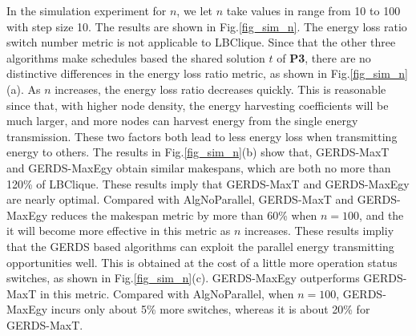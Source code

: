 \documentclass[journal,10pt]{IEEEtran}
\begin{document}
In the simulation experiment for $n$, we let $n$ take values in range from 10 to 100 with step size 10. The results are shown in Fig.\ref{fig_sim_n}. The energy loss ratio switch number metric is not applicable to LBClique. Since that the other three algorithms make schedules based the shared solution $t$ of \textbf{P3}, there are no distinctive differences in the energy loss ratio metric, as shown in Fig.\ref{fig_sim_n}(a). As $n$ increases, the energy loss ratio decreases quickly. This is reasonable since that, with higher node density, the energy harvesting coefficients will be much larger, and more nodes can harvest energy from the single energy transmission. These two factors both lead to less energy loss when transmitting energy to others. The results in Fig.\ref{fig_sim_n}(b) show that, GERDS-MaxT and GERDS-MaxEgy obtain similar makespans, which are both no more than 120\% of LBClique. These results imply that GERDS-MaxT and GERDS-MaxEgy are nearly optimal. Compared with AlgNoParallel, GERDS-MaxT and GERDS-MaxEgy reduces the makespan metric by more than 60\% when $n{=}100$, and the it will become more effective in this metric as $n$ increases. These results impliy that the GERDS based algorithms can exploit the parallel energy transmitting opportunities well. This is obtained at the cost of a little more operation status switches, as shown in Fig.\ref{fig_sim_n}(c).
GERDS-MaxEgy outperforms GERDS-MaxT in this metric. Compared with AlgNoParallel, when $n{=}100$, GERDS-MaxEgy incurs only about 5\% more switches, whereas it is about 20\% for GERDS-MaxT.
\end{document}

